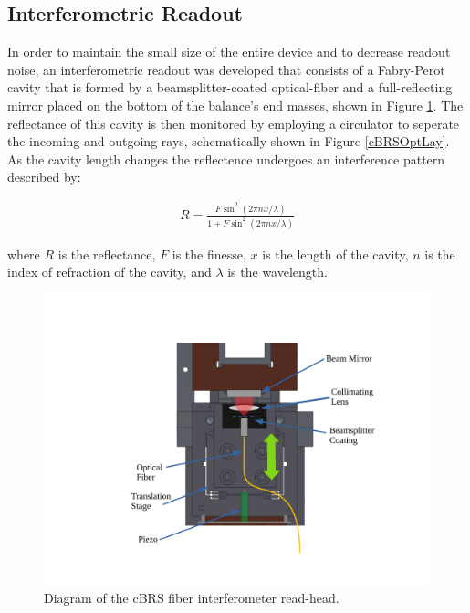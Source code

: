 \documentclass [12pt, proquest]{uwthesis}[2019]
\begin{document}
\subsection{Interferometric Readout}
In order to maintain the small size of the entire device and to decrease readout noise, an interferometric readout was developed that consists of a Fabry-Perot cavity that is formed by a beamsplitter-coated optical-fiber and a full-reflecting mirror placed on the bottom of the balance's end masses, shown in Figure \ref{cBRSOpt}. The reflectance of this cavity is then monitored by employing a circulator to seperate the incoming and outgoing rays, schematically shown in Figure \ref{cBRSOptLay}. As the cavity length changes the reflectence undergoes an interference pattern described by:

\begin{align}
R=\frac{F \sin^2(2\pi n x/\lambda)}{1+F \sin^2(2\pi n x/\lambda)}
\end{align}

where $R$ is the reflectance, $F$ is the finesse, $x$ is the length of the cavity, $n$ is the index of refraction of the cavity, and $\lambda$ is the wavelength.

\begin{figure}[!h]
\begin{center}
\includegraphics[width=\textwidth]{cBRSOptics.pdf}
\end{center}
\caption[Diagram of the cBRS fiber interferometer read-head]{Diagram of the cBRS fiber interferometer read-head.}
\label{cBRSOpt}
\end{figure}
\end{document}
